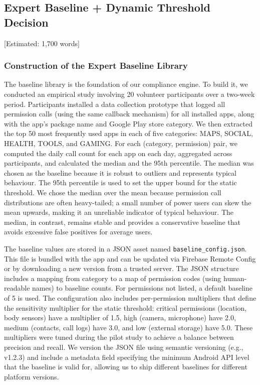 \subsection{Expert Baseline + Dynamic Threshold Decision} [Estimated: 1,700 words]

\subsubsection{Construction of the Expert Baseline Library}

The baseline library is the foundation of our compliance engine. To build it, we conducted an empirical study involving 20 volunteer participants over a two-week period. Participants installed a data collection prototype that logged all permission calls (using the same callback mechanism) for all installed apps, along with the app's package name and Google Play store category. We then extracted the top 50 most frequently used apps in each of five categories: MAPS, SOCIAL, HEALTH, TOOLS, and GAMING. For each (category, permission) pair, we computed the daily call count for each app on each day, aggregated across participants, and calculated the median and the 95th percentile. The median was chosen as the baseline because it is robust to outliers and represents typical behaviour. The 95th percentile is used to set the upper bound for the static threshold. We chose the median over the mean because permission call distributions are often heavy-tailed; a small number of power users can skew the mean upwards, making it an unreliable indicator of typical behaviour. The median, in contrast, remains stable and provides a conservative baseline that avoids excessive false positives for average users.

The baseline values are stored in a JSON asset named \texttt{baseline\_config.json}. This file is bundled with the app and can be updated via Firebase Remote Config or by downloading a new version from a trusted server. The JSON structure includes a mapping from category to a map of permission codes (using human-readable names) to baseline counts. For permissions not listed, a default baseline of 5 is used. The configuration also includes per-permission multipliers that define the sensitivity multiplier for the static threshold: critical permissions (location, body sensors) have a multiplier of 1.5, high (camera, microphone) have 2.0, medium (contacts, call logs) have 3.0, and low (external storage) have 5.0. These multipliers were tuned during the pilot study to achieve a balance between precision and recall. We version the JSON file using semantic versioning (e.g., v1.2.3) and include a metadata field specifying the minimum Android API level that the baseline is valid for, allowing us to ship different baselines for different platform versions.

